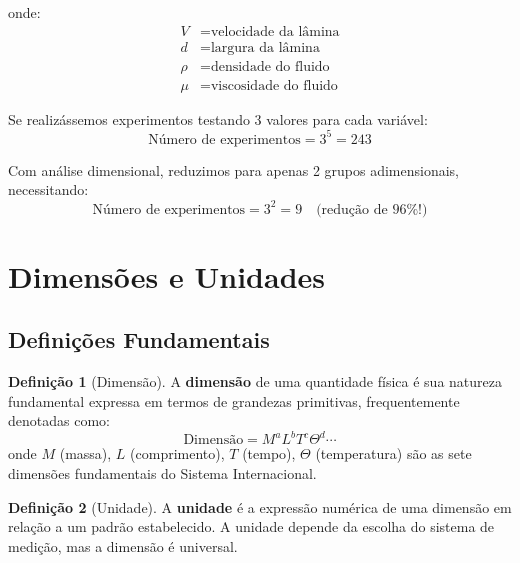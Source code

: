 \documentclass[12pt,a4paper,oneside]{book}
\theoremstyle{definition}
\newtheorem{definition}{Definição}[chapter]
\begin{document}
onde:
\begin{align}
    V &= \text{velocidade da lâmina} \\
    d &= \text{largura da lâmina} \\
    \rho &= \text{densidade do fluido} \\
    \mu &= \text{viscosidade do fluido}
\end{align}

Se realizássemos experimentos testando 3 valores para cada variável:
\begin{equation}
    \text{Número de experimentos} = 3^5 = 243
\end{equation}

Com análise dimensional, reduzimos para apenas 2 grupos adimensionais, necessitando:
\begin{equation}
    \text{Número de experimentos} = 3^2 = 9 \quad \text{(redução de } 96\%\text{!)}
\end{equation}

\section{Dimensões e Unidades}

\subsection{Definições Fundamentais}

\begin{definition}[Dimensão]
A \textbf{dimensão} de uma quantidade física é sua natureza fundamental expressa em termos de grandezas primitivas, frequentemente denotadas como:
\begin{equation}
    \text{Dimensão} = M^a L^b T^c \Theta^d \cdots
\end{equation}
onde $M$ (massa), $L$ (comprimento), $T$ (tempo), $\Theta$ (temperatura) são as sete dimensões fundamentais do Sistema Internacional.
\end{definition}

\begin{definition}[Unidade]
A \textbf{unidade} é a expressão numérica de uma dimensão em relação a um padrão estabelecido. A unidade depende da escolha do sistema de medição, mas a dimensão é universal.
\end{definition}
\end{document}
